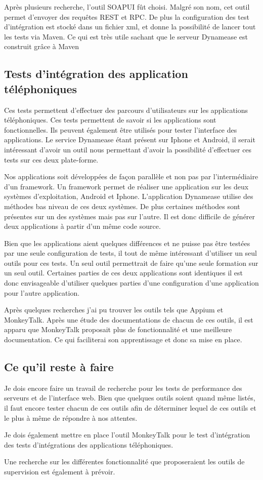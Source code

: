 Après plusieurs recherche, l'outil SOAPUI fût choisi. Malgré son nom, cet outil permet d'envoyer des requêtes REST et RPC. De plus la configuration des test d'intégration est stocké dans un fichier xml, et donne la possibilité de lancer tout les tests via Maven. Ce qui est très utile sachant que le serveur Dynamease est construit grâce à Maven

\subsection{Tests d'intégration des application téléphoniques}

Ces tests permettent d'effectuer des parcours d'utilisateurs sur les applications téléphoniques. Ces tests permettent de savoir si les applications sont fonctionnelles. Ils peuvent également être utilisés pour tester l'interface des applications. Le service Dynamease étant présent sur Iphone et Android, il serait intéressant d'avoir un outil nous permettant d'avoir la possibilité d'effectuer ces tests sur ces deux plate-forme. 

Nos applications soit développées de façon parallèle et non pas par l'intermédiaire d'un framework. Un framework permet de réaliser une application sur les deux systèmes d'exploitation, Android et Iphone. L'application Dynamease utilise des méthodes bas niveau de ces deux systèmes. De plus certaines méthodes sont présentes sur un des systèmes mais pas sur l'autre. Il est donc difficile de générer deux applications à partir d'un même code source.

Bien que les applications aient quelques différences et ne puisse pas être testées par une seule configuration de tests, il tout de même intéressant d'utiliser un seul outils pour ces tests. Un seul outil permettrait de faire qu'une seule formation sur un seul outil. Certaines parties de ces deux applications sont identiques il est donc envisageable d'utiliser quelques parties d'une configuration d'une application pour l'autre application.

Après quelques recherches j'ai pu trouver les outils tels que Appium et MonkeyTalk. Après une étude des documentations de chacun de ces outils, il est apparu que MonkeyTalk proposait plus de fonctionnalité et une meilleure documentation. Ce qui faciliterai son apprentissage et donc sa mise en place.


\subsection{Ce qu'il reste à faire}

Je dois encore faire un travail de recherche pour les tests de performance des serveurs et de l'interface web. Bien que quelques outils soient quand même listés, il faut encore tester chacun de ces outils afin de déterminer lequel de ces outils et le plus à même de répondre à nos attentes.

Je dois également mettre en place l'outil MonkeyTalk pour le test d'intégration des tests d'intégrations des applications téléphoniques.

Une recherche sur les différentes fonctionnalité que proposeraient les outils de supervision est également à prévoir. 